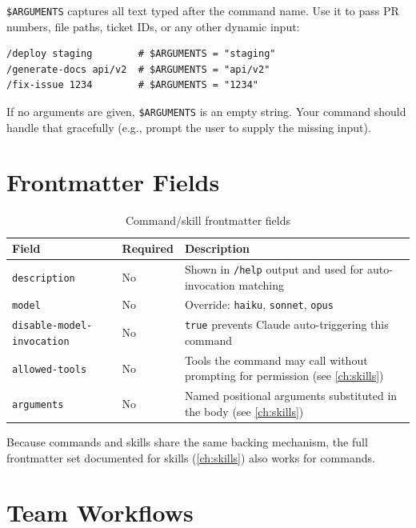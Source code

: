 
\texttt{\$ARGUMENTS} captures all text typed after the command name. Use it
to pass PR numbers, file paths, ticket IDs, or any other dynamic input:

\begin{lstlisting}[caption={Examples of \$ARGUMENTS usage}]
/deploy staging        # $ARGUMENTS = "staging"
/generate-docs api/v2  # $ARGUMENTS = "api/v2"
/fix-issue 1234        # $ARGUMENTS = "1234"
\end{lstlisting}

If no arguments are given, \texttt{\$ARGUMENTS} is an empty string. Your
command should handle that gracefully (e.g., prompt the user to supply
the missing input).

\section{Frontmatter Fields}
\label{sec:command-frontmatter}

\begin{table}[ht]
\centering
\caption{Command/skill frontmatter fields}
\label{tab:command-frontmatter}
\begin{tabularx}{\textwidth}{llX}
\toprule
\textbf{Field} & \textbf{Required} & \textbf{Description} \\
\midrule
\texttt{description}              & No  & Shown in \texttt{/help} output and used for auto-invocation matching \\
\texttt{model}                    & No  & Override: \texttt{haiku}, \texttt{sonnet}, \texttt{opus} \\
\texttt{disable-model-invocation} & No  & \texttt{true} prevents Claude auto-triggering this command \\
\texttt{allowed-tools}            & No  & Tools the command may call without prompting for permission (see \cref{ch:skills}) \\
\texttt{arguments}                & No  & Named positional arguments substituted in the body (see \cref{ch:skills}) \\
\bottomrule
\end{tabularx}
\end{table}

Because commands and skills share the same backing mechanism, the full
frontmatter set documented for skills (\cref{ch:skills}) also works
for commands.

\section{Team Workflows}
\label{sec:command-team}

